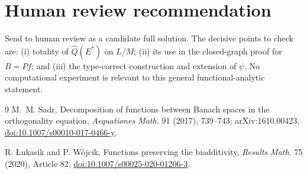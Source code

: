 \documentclass[11pt]{article}
\begin{document}
\section{Human review recommendation}

Send to human review as a candidate full solution. The decisive points to check are: (i) totality of $\widehat Q(E^*)$ on $L/M$; (ii) its use in the closed-graph proof for $B=Pf$; and (iii) the type-correct construction and extension of $\psi$. No computational experiment is relevant to this general functional-analytic statement.

\begin{thebibliography}{9}
M.~M. Sadr,
\newblock Decomposition of functions between Banach spaces in the orthogonality equation,
\newblock \emph{Aequationes Math.} 91 (2017), 739--743;
arXiv:1610.00423,
\href{https://doi.org/10.1007/s00010-017-0466-y}{doi:10.1007/s00010-017-0466-y}.

R. \L ukasik and P. W\'ojcik,
\newblock Functions preserving the biadditivity,
\newblock \emph{Results Math.} 75 (2020), Article 82,
\href{https://doi.org/10.1007/s00025-020-01206-3}{doi:10.1007/s00025-020-01206-3}.
\end{thebibliography}
\end{document}

